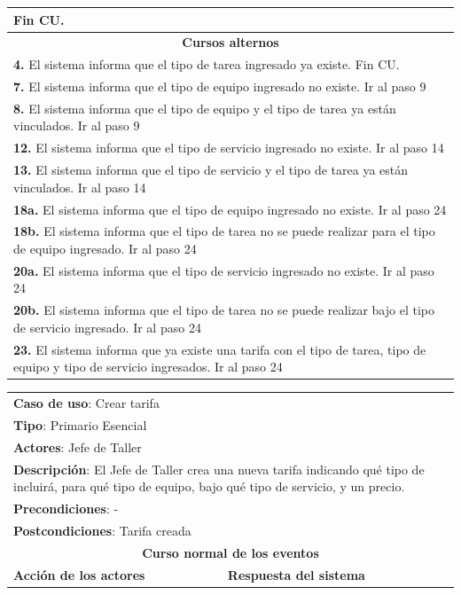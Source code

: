 \documentclass[12pt]{extarticle}
\begin{document}
\begin{spacing}{1.2}
\begin{longtable}{ |p{8cm}|p{8cm}| }
			\inc Fin CU. & \\
		\hline
		\multicolumn{2}{|c|}{\textbf{Cursos alternos}}\\
		\hline
		\multicolumn{2}{|p{16cm}|}{\textbf{4. }El sistema informa que el tipo de tarea ingresado ya existe. Fin CU.}\\
		\hline
		\multicolumn{2}{|p{16cm}|}{\textbf{7. }El sistema informa que el tipo de equipo ingresado no existe. Ir al paso 9}\\
		\hline	
		\multicolumn{2}{|p{16cm}|}{\textbf{8. }El sistema informa que el tipo de equipo y el tipo de tarea ya están vinculados. Ir al paso 9}\\
		\hline	
		\multicolumn{2}{|p{16cm}|}{\textbf{12. }El sistema informa que el tipo de servicio ingresado no existe. Ir al paso 14}\\
		\hline	
		\multicolumn{2}{|p{16cm}|}{\textbf{13. }El sistema informa que el tipo de servicio y el tipo de tarea ya están vinculados. Ir al paso 14}\\
		\hline	
		\multicolumn{2}{|p{16cm}|}{\textbf{18a. }El sistema informa que el tipo de equipo ingresado no existe. Ir al paso 24}\\
		\hline	
		\multicolumn{2}{|p{16cm}|}{\textbf{18b. }El sistema informa que el tipo de tarea no se puede realizar para el tipo de equipo ingresado. Ir al paso 24}\\
		\hline	
		\multicolumn{2}{|p{16cm}|}{\textbf{20a. }El sistema informa que el tipo de servicio ingresado no existe. Ir al paso 24}\\
		\hline	
		\multicolumn{2}{|p{16cm}|}{\textbf{20b. }El sistema informa que el tipo de tarea no se puede realizar bajo el tipo de servicio ingresado. Ir al paso 24}\\
		\hline	
		\multicolumn{2}{|p{16cm}|}{\textbf{23. }El sistema informa que ya existe una tarifa con el tipo de tarea, tipo de equipo y tipo de servicio ingresados. Ir al paso 24}\\
		\hline	
	\end{longtable}

    \finCU{}


	\begin{longtable}{ |p{8cm}|p{8cm}| }
		\hline
		\multicolumn{2}{|p{16cm}|}{\textbf{Caso de uso}: Crear tarifa}\\
		\multicolumn{2}{|p{16cm}|}{\textbf{Tipo}: Primario Esencial}\\
		\multicolumn{2}{|p{16cm}|}{\textbf{Actores}: Jefe de Taller}\\
		\multicolumn{2}{|p{16cm}|}{\textbf{Descripción}: El Jefe de Taller crea una nueva tarifa indicando qué tipo de incluirá, para qué tipo de equipo, bajo qué tipo de servicio, y un precio.}\\
		\multicolumn{2}{|p{16cm}|}{\textbf{Precondiciones}: -}\\
		\multicolumn{2}{|p{16cm}|}{\textbf{Postcondiciones}: Tarifa creada}\\
		\hline
		\multicolumn{2}{|c|}{\textbf{Curso normal de los eventos}}\\
		\hline
		\textbf{Acción de los actores} & \textbf{Respuesta del sistema}\\
		\hline


\end{longtable}
\end{spacing}
\end{document}
